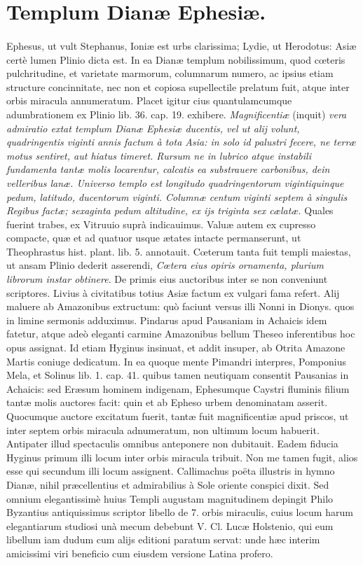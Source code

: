 \documentclass[a4paper, 11pt, oneside, polutonikogreek, latin]{article}
\begin{document}
\section{Templum Dianæ Ephesiæ.}
\paragraph{}
Ephesus, ut vult Stephanus, Ioniæ est urbs clarissima; Lydie, ut Herodotus: Asiæ certè lumen Plinio dicta est. In ea Dianæ templum nobilissimum, quod cœteris pulchritudine, et varietate marmorum, columnarum numero, ac ipsius etiam structure concinnitate, nec non et copiosa supellectile prelatum fuit, atque inter orbis miracula annumeratum. Placet igitur cius quantulamcumque adumbrationem ex Plinio lib. 36. cap. 19. exhibere. \emph{Magnificentiæ} (inquit) \emph{vera admiratio extat templum Dianæ Ephesiæ ducentis, vel ut alij volunt, quadringentis viginti annis factum à tota Asia: in solo id palustri fecere, ne terræ motus sentiret, aut hiatus timeret. Rursum ne in lubrico atque instabili fundamenta tantæ molis locarentur, calcatis ea substrauere carbonibus, dein velleribus lanæ. Universo templo est longitudo quadringentorum vigintiquinque pedum, latitudo, ducentorum viginti. Columnæ centum viginti septem à singulis Regibus factæ; sexaginta pedum altitudine, ex ijs triginta sex cælatæ.} Quales fuerint trabes, ex Vitruuio suprà indicauimus. Valuæ autem ex cupresso compacte, quæ et ad quatuor usque ætates intacte permanserunt, ut Theophrastus hist. plant. lib. 5. annotauit. Cœterum tanta fuit templi maiestas, ut ansam Plinio dederit asserendi, \emph{Cœtera eius opiris ornamenta, plurium librorum instar obtinere}. De primis eius auctoribus inter se non conveniunt scriptores. Livius à civitatibus totius Asiæ factum ex vulgari fama refert. Alij maluere ab Amazonibus extructum: quò faciunt versus illi Nonni in Dionys. quos in limine sermonis adduximus. Pindarus apud Pausaniam in Achaicis idem fatetur, atque adeò eleganti carmine Amazonibus bellum Theseo inferentibus hoc opus assignat. Id etiam Hyginus insinuat, et addit insuper, ab Otrita Amazone Martis coniuge dedicatum. In ea quoque mente Pimandri interpres, Pomponius Mela, et Solinus lib. 1. cap. 41. quibus tamen neutiquam consentit Pausanias in Achaicis: sed Eræsum hominem indigenam, Ephesumque Caystri fluminis filium tantæ molis auctores facit: quin et ab Epheso urbem denominatam asserit. Quocumque auctore excitatum fuerit, tantæ fuit magnificentiæ apud priscos, ut inter septem orbis miracula adnumeratum, non ultimum locum habuerit. Antipater illud spectaculis omnibus anteponere non dubitauit. Eadem fiducia Hyginus primum illi locum inter orbis miracula tribuit. Non me tamen fugit, alios esse qui secundum illi locum assignent. Callimachus poëta illustris in hymno Dianæ, nihil præcellentius et admirabilius à Sole oriente conspici dixit. Sed omnium elegantissimè huius Templi augustam magnitudinem depingit Philo Byzantius antiquissimus scriptor libello de 7. orbis miraculis, cuius locum harum elegantiarum studiosi unà mecum debebunt V. Cl. Lucæ Holstenio, qui eum libellum iam dudum cum alijs editioni paratum servat: unde hæc interim amicissimi viri beneficio cum eiusdem versione Latina profero.
\end{document}
